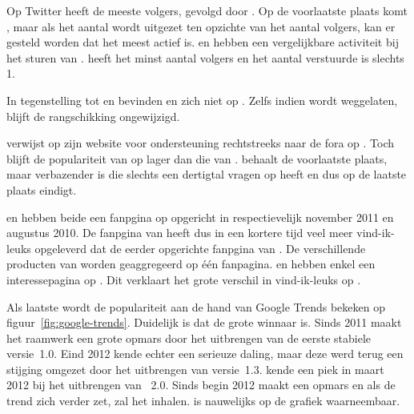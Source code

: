 Op Twitter heeft \jqm{} de meeste volgers, gevolgd door \kendo.
Op de voorlaatste plaats komt \lungo{}, maar als het aantal  wordt uitgezet ten opzichte van het aantal volgers, kan er gesteld worden dat \lungo{} het meest actief is.
\jqm{} en \kendo{} hebben een vergelijkbare activiteit bij het sturen van .
\st{} heeft het minst aantal volgers en het aantal verstuurde  is slechts 1.


In tegenstelling tot \jqm{} en \lungo{} bevinden \kendo{} en \st{} zich niet op \gh{}.
Zelfs indien \gh{} wordt weggelaten, blijft de rangschikking ongewijzigd.

\kendo{} verwijst op zijn website voor ondersteuning rechtstreeks naar de fora op \so{}. 
Toch blijft de populariteit van \kendo{} op \so{} lager dan die van \jqm{}.
\st{} behaalt de voorlaatste plaats, maar verbazender is \lungo{} die slechts een dertigtal vragen op \so{} heeft en dus op de laatste plaats eindigt.

\kendo{} en \jqm{} hebben beide een fanpgina op \fb{} opgericht in respectievelijk november 2011 en augustus 2010.
De fanpgina van \kendo{} heeft dus in een kortere tijd veel meer vind-ik-leuks opgeleverd dat de eerder opgerichte fanpgina van \jqm{}.
De verschillende producten van \kendo{} worden geaggregeerd op één fanpagina. 
\st{} en \lungo{} hebben enkel een interessepagina op \fb.
Dit verklaart het grote verschil in vind-ik-leuks op \fb.

Als laatste wordt de populariteit aan de hand van Google Trends bekeken op figuur~\ref{fig:google-trends}.
Duidelijk is dat \jqm{} de grote winnaar is.
Sinds 2011 maakt het raamwerk een grote opmars door het uitbrengen van de eerste stabiele versie~1.0.
Eind 2012 kende \jqm{} echter een serieuze daling, maar deze werd terug een stijging omgezet door het uitbrengen van versie~1.3. 
\st{} kende een piek in maart 2012 bij het uitbrengen van \st{}~2.0.
Sinds begin 2012 maakt \kendo{} een opmars en als de trend zich verder zet, zal het \st{} inhalen.
\lungo{} is nauwelijks op de grafiek waarneembaar.

